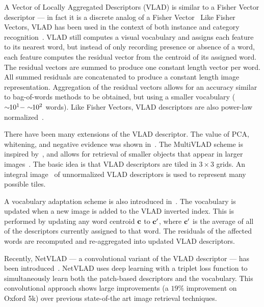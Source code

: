         A Vector of Locally Aggregated Descriptors (VLAD) is similar to a Fisher Vector descriptor --- in fact it
        is a discrete analog of a Fisher Vector~\cite{jegou_aggregating_2010, jegou_aggregating_2012} Like Fisher
        Vectors, VLAD has been used in the context of both instance and category
        recognition~\cite{jegou_negative_2012, delhumeau_revisiting_2013, arandjelovic_all_2013}. VLAD still
        computes a visual vocabulary and assigns each feature to its nearest word, but instead of only recording
        presence or absence of a word, each feature computes the residual vector from the centroid of its assigned
        word. The residual vectors are summed to produce one constant length vector per word. All summed residuals
        are concatenated to produce a constant length image representation. Aggregation of the residual vectors
        allows for an accuracy similar to bag-of-words methods to be obtained, but using a smaller vocabulary
        ($\sim\mkern-6mu 10^{1} - \sim\mkern-6mu 10^{2}$ words). Like Fisher Vectors, VLAD descriptors are also power-law
        normalized~\cite{jegou_aggregating_2012}.

        There have been many extensions of the VLAD descriptor. The value of PCA, whitening, and negative evidence
        was shown in~\cite{jegou_negative_2012}. The MultiVLAD scheme is inspired by~\cite{torii_visual_2011}, and
        allows for retrieval of smaller objects that appear in larger images~\cite{arandjelovic_all_2013}. The
        basic idea is that VLAD descriptors are tiled in $3 \times 3$ grids. An integral
        image~\cite{viola_robust_2004} of unnormalized VLAD descriptors is used to represent many possible tiles.

        A vocabulary adaptation scheme is also introduced in~\cite{arandjelovic_all_2013}. The vocabulary is
        updated when a new image is added to the VLAD inverted index. This is performed by updating any word
        centroid $\mathbf{c}$ to $\mathbf{c}'$, where $\mathbf{c}'$ is the average of all of the descriptors currently assigned to that
        word. The residuals of the affected words are recomputed and re-aggregated into updated VLAD descriptors.

        Recently, NetVLAD --- a convolutional variant of the VLAD descriptor --- has been
        introduced~\cite{arandjelovic_netvlad_2016,radenovic_cnn_2016}. NetVLAD uses deep learning with a triplet
        loss function to simultaneously learn both the patch-based descriptors and the vocabulary. This
        convolutional approach shows large improvements (a $19\percent$ improvement on Oxford 5k) over previous
        state-of-the art image retrieval techniques.


